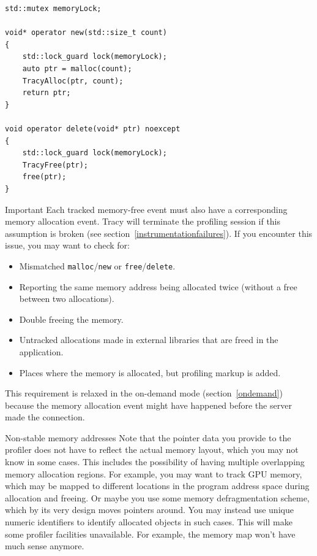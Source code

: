 \documentclass[hidelinks,titlepage,a4paper,twoside]{article}
\begin{document}
\begin{lstlisting}
std::mutex memoryLock;

void* operator new(std::size_t count)
{
    std::lock_guard lock(memoryLock);
    auto ptr = malloc(count);
    TracyAlloc(ptr, count);
    return ptr;
}

void operator delete(void* ptr) noexcept
{
    std::lock_guard lock(memoryLock);
    TracyFree(ptr);
    free(ptr);
}
\end{lstlisting}

\begin{bclogo}[
noborder=true,
couleur=black!5,
logo=\bcbombe
]{Important}
Each tracked memory-free event must also have a corresponding memory allocation event. Tracy will terminate the profiling session if this assumption is broken (see section~\ref{instrumentationfailures}). If you encounter this issue, you may want to check for:

\begin{itemize}
\item Mismatched \texttt{malloc}/\texttt{new} or \texttt{free}/\texttt{delete}.
\item Reporting the same memory address being allocated twice (without a free between two allocations).
\item Double freeing the memory.
\item Untracked allocations made in external libraries that are freed in the application.
\item Places where the memory is allocated, but profiling markup is added.
\end{itemize}

This requirement is relaxed in the on-demand mode (section~\ref{ondemand}) because the memory allocation event might have happened before the server made the connection.
\end{bclogo}

\begin{bclogo}[
noborder=true,
couleur=black!5,
logo=\bclampe
]{Non-stable memory addresses}
Note that the pointer data you provide to the profiler does not have to reflect the actual memory layout, which you may not know in some cases. This includes the possibility of having multiple overlapping memory allocation regions. For example, you may want to track GPU memory, which may be mapped to different locations in the program address space during allocation and freeing. Or maybe you use some memory defragmentation scheme, which by its very design moves pointers around. You may instead use unique numeric identifiers to identify allocated objects in such cases. This will make some profiler facilities unavailable. For example, the memory map won't have much sense anymore.
\end{bclogo}
\end{document}
